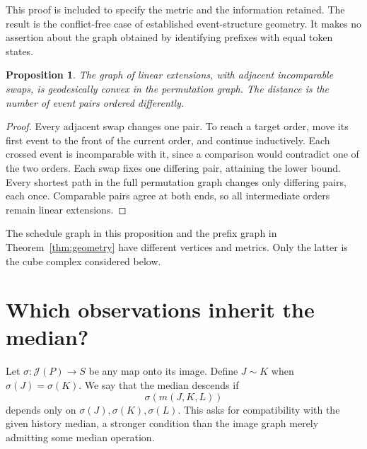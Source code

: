 \documentclass[11pt]{article}
\newtheorem{proposition}[theorem]{Proposition}
\theoremstyle{definition}
\newcommand{\Id}{\mathcal J}
\numberwithin{equation}{section}
\begin{document}
This proof is included to specify the metric and the information
retained. The result is the conflict-free case of established
event-structure geometry. It makes no assertion about the graph
obtained by identifying prefixes with equal token states.

\begin{proposition}\label{prop:orders}
The graph of linear extensions, with adjacent incomparable swaps,
is geodesically convex in the permutation graph. The distance is
the number of event pairs ordered differently.
\end{proposition}
\begin{proof}
Every adjacent swap changes one pair. To reach a target order, move
its first event to the front of the current order, and continue
inductively. Each crossed event is incomparable with it, since a
comparison would contradict one of the two orders. Each swap fixes
one differing pair, attaining the lower bound. Every shortest path
in the full permutation graph changes only differing pairs, each
once. Comparable pairs agree at both ends, so all intermediate
orders remain linear extensions.
\end{proof}

The schedule graph in this proposition and the prefix graph in
Theorem~\ref{thm:geometry} have different vertices and metrics.
Only the latter is the cube complex considered below.

\section{Which observations inherit the median?}\label{sec:quotient}

Let $\sigma:\Id(P)\to S$ be any map onto its image. Define
$J\sim K$ when $\sigma(J)=\sigma(K)$.
We say that the median descends if
\begin{equation}\label{eq:descend}
 \sigma(m(J,K,L))
\end{equation}
depends only on $\sigma(J),\sigma(K),\sigma(L)$.
This asks for compatibility with the given history median, a stronger
condition than the image graph merely admitting some median operation.
\end{document}
